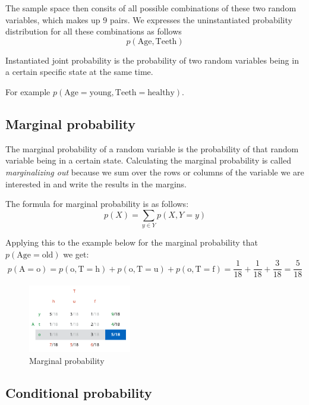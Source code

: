 \documentclass[12pt]{article}
\begin{document}
The sample space then consits of all possible combinations of these two random variables, which makes up 9 pairs. We expresses the uninstantiated probability distribution for all these combinations as follows 
\[
    p(\text{Age}, \text{Teeth})  
\]

\begin{definition}[Instantiated joint probability $p(X = x, Y = y)$]
    Instantiated joint probability is the probability of two random variables being in a certain specific state at the same time.
\end{definition}

For example $p(\text{Age} = \text{young}, \text{Teeth} = \text{healthy})$.

\subsection{Marginal probability}

\begin{definition}
The marginal probability of a random variable is the probability of that random variable being in a certain state. Calculating the marginal probability is called \textit{marginalizing out} because we sum over the rows or columns of the variable we are interested in and write the results in the margins.
\end{definition}

The formula for marginal probability is as follows:
\[
    p(X) = \sum_{y \in Y} p(X, Y = y)  
\]

Applying this to the example below for the marginal probability that $p(\text{Age} = \text{old})$ we get:
\[
    p(\text{A} = \text{o}) = p(\text{o}, \text{T} = \text{h}) + p(\text{o}, \text{T} = \text{u}) + p(\text{o}, \text{T} = \text{f}) = \frac{1}{18} + \frac{1}{18} + \frac{3}{18} = \frac{5}{18} 
\] 
\begin{figure}[h!]
    \centering
    \includegraphics[width=0.4\textwidth]{assets/marginalprob.png}
    \caption{Marginal probability}
\end{figure}

\subsection{Conditional probability}
\end{document}
